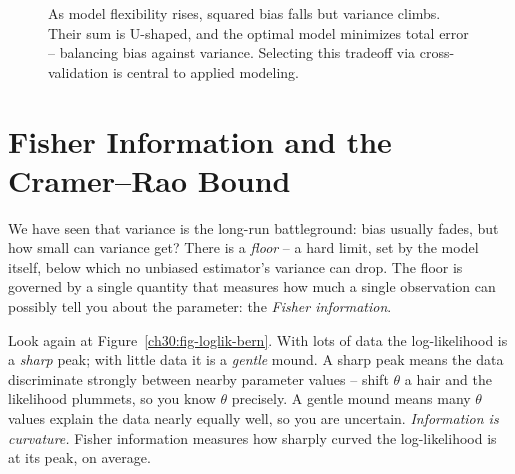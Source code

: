 \begin{figure}[H]
\centering
{}
\caption{As model flexibility rises, squared bias falls but variance climbs.
Their sum is U-shaped, and the optimal model minimizes total error -- balancing
bias against variance. Selecting this tradeoff via cross-validation is central to applied modeling.}
\label{ch30:fig-bv-curve}
\end{figure}

\section{Fisher Information and the Cramer--Rao Bound}
\label{ch30:fisher}

We have seen that variance is the long-run battleground: bias usually fades, but
how small can variance get? There is a \emph{floor} -- a hard limit,
set by the model itself, below which no unbiased estimator's variance can drop.
The floor is governed by a single quantity that measures how much a single
observation can possibly tell you about the parameter: the \emph{Fisher
information}.

\begin{intuitionbox}
Look again at Figure~\ref{ch30:fig-loglik-bern}. With lots of data the
log-likelihood is a \emph{sharp} peak; with little data it is a \emph{gentle}
mound. A sharp peak means the data discriminate strongly between nearby
parameter values -- shift $\theta$ a hair and the likelihood plummets, so you
know $\theta$ precisely. A gentle mound means many $\theta$ values explain the
data nearly equally well, so you are uncertain. \emph{Information is curvature.}
Fisher information measures how sharply curved the log-likelihood is at its peak,
on average.
\end{intuitionbox}

